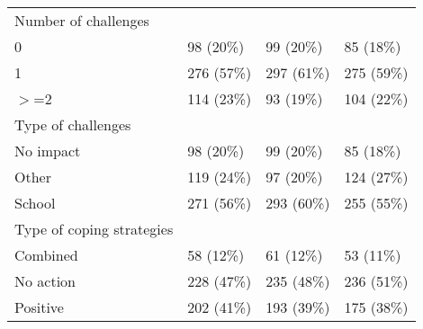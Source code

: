 \begin{table}[ht]
\begin{tabular}{llll}
  Number of challenges &  &  &  \\ 
  0 & 98 (20\%) & 99 (20\%) & 85 (18\%) \\ 
  1 & 276 (57\%) & 297 (61\%) & 275 (59\%) \\ 
  $>$=2 & 114 (23\%) & 93 (19\%) & 104 (22\%) \\ 
  Type of challenges &  &  &  \\ 
  No impact & 98 (20\%) & 99 (20\%) & 85 (18\%) \\ 
  Other & 119 (24\%) & 97 (20\%) & 124 (27\%) \\ 
  School & 271 (56\%) & 293 (60\%) & 255 (55\%) \\ 
  Type of coping strategies &  &  &  \\ 
  Combined & 58 (12\%) & 61 (12\%) & 53 (11\%) \\ 
  No action & 228 (47\%) & 235 (48\%) & 236 (51\%) \\ 
  Positive & 202 (41\%) & 193 (39\%) & 175 (38\%) \\ 
   \hline
\end{tabular}
\end{table}


